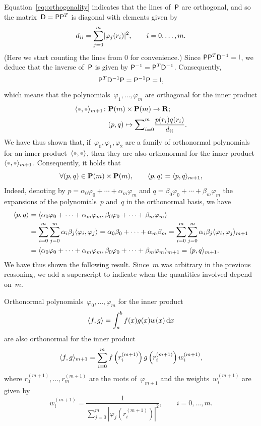 Equation~\eqref{eq:orthogonality} indicates that the lines of~$\mathsf P$ are orthogonal,
and so the matrix~$\mathsf D = \mathsf P \mathsf P^T$ is diagonal with elements given by
\[
    d_{ii} = \sum_{j=0}^{m} \lvert\varphi_j(r_i)\rvert^2,
    \qquad i = 0, \dotsc, m.
\]
(Here we start counting the lines from 0 for convenience.)
Since $\mathsf P \mathsf P^T \mathsf D^{-1} = \mathsf I$,
we deduce that the inverse of~$\mathsf P$ is given by $\mathsf P^{-1} = \mathsf P^T \mathsf D^{-1}$.
Consequently,
\[
    \mathsf P^T \mathsf D^{-1} \mathsf P = \mathsf P^{-1} \mathsf P = \mathsf I,
\]
which means that the polynomials~$\varphi_1, \dotsc, \varphi_m$ are orthogonal for the inner product
\begin{align*}
    \ip{\placeholder, \placeholder}_{m+1} \colon& \poly(m) \times \poly(m) \to \real; \\
                              &(p, q) \mapsto \vect \sum_{i=0}^{m} \frac{p(r_i) q(r_i)}{d_{ii}}.
\end{align*}
We have thus shown that,
if~$\varphi_0, \varphi_1, \varphi_2$ are a family of orthonormal polynomials for an inner product~$\ip{\placeholder,\placeholder}$,
then they are also orthonormal for the inner product~$\ip{\placeholder,\placeholder}_{m+1}$.
Consequently, it holds that
\begin{equation}
    \label{eq:orthogonality_equivalence}
    \forall (p, q) \in \mathbf P(m) \times \mathbf P(m), \qquad
    \langle p,q\rangle = \langle p, q\rangle_{m+1},
\end{equation}
Indeed, denoting by $p = \alpha_0 \varphi_0 + \dotsb + \alpha_m \varphi_m$ and $q = \beta_0 \varphi_0 + \dotsb + \beta_m \varphi_m$ the expansions of the polynomials~$p$ and~$q$
in the orthonormal basis,
we have
\begin{align*}
    \langle p, q\rangle
    &= \langle\alpha_0 \varphi_0 + \dotsb + \alpha_m \varphi_m,\beta_0 \varphi_0 + \dotsb + \beta_m \varphi_m\rangle \\
    &= \sum_{i=0}^{m} \sum_{j=0}^{m} \alpha_i \beta_j \langle\varphi_i, \varphi_j\rangle
    = \alpha_0 \beta_0 + \dotsb + \alpha_m \beta_m
    = \sum_{i=0}^{m} \sum_{j=0}^{m} \alpha_i \beta_j \langle\varphi_i, \varphi_j\rangle_{m+1} \\
    & = \langle\alpha_0 \varphi_0 + \dotsb + \alpha_m \varphi_m,\beta_0 \varphi_0 + \dotsb + \beta_m \varphi_m\rangle_{m+1} = \langle p,q\rangle_{m+1}.
\end{align*}
We have thus shown the following result.
Since~$m$ was arbitrary in the previous reasoning,
we add a superscript to indicate when the quantities involved depend on~$m$.
\begin{theorem}
    Orthonormal polynomials~$\varphi_0, \dotsc, \varphi_{m}$ for the inner product
    \[
        \langle f, g\rangle = \int_{a}^{b} f(x) g(x) w(x) \, \mathrm d x
    \]
    are also orthonormal for the inner product
    \[
        \langle f,g\rangle_{m+1} = \sum_{i=0}^{m} f\left(r^{(m+1)}_i\right) g\left(r^{(m+1)}_i\right) w^{(m+1)}_i,
    \]
    where $r^{(m+1)}_0, \dotsc, r^{(m+1)}_m$ are the roots of~$\varphi_{m+1}$ and
    the weights~$w^{(m+1)}_i$ are given by
    \[
        w^{(m+1)}_i = \frac{1}{\sum_{j=0}^{m} \left\lvert \varphi_j\left(r^{(m+1)}_i\right) \right\rvert^2}, \qquad i = 0, \dotsc, m.
    \]
\end{theorem}
